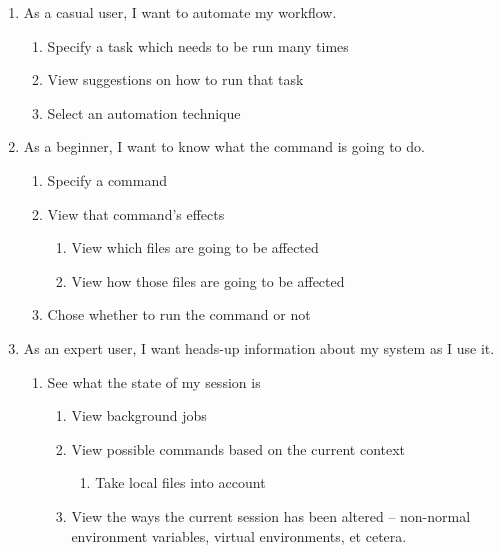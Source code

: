 \begin{enumerate}
  \item As a casual user, I want to automate my workflow.
  \begin{enumerate}
    \item Specify a task which needs to be run many times
    \item View suggestions on how to run that task
    \item Select an automation technique
  \end{enumerate}

  \item As a beginner, I want to know what the command is going to do.
  \begin{enumerate}
    \item Specify a command
    \item View that command’s effects
    \begin{enumerate}
      \item View which files are going to be affected
      \item View how those files are going to be affected
    \end{enumerate}
    \item Chose whether to run the command or not
  \end{enumerate}

  \item As an expert user, I want heads-up information about my system as I use it.
  \begin{enumerate}
    \item See what the state of my session is
    \begin{enumerate}
      \item View background jobs
      \item View possible commands based on the current context
      \begin{enumerate}
        \item Take local files into account
      \end{enumerate}
      \item View the ways the current session has been altered \--- non-normal
      environment variables, virtual environments, et cetera.
    \end{enumerate}
  \end{enumerate}
\end{enumerate}
